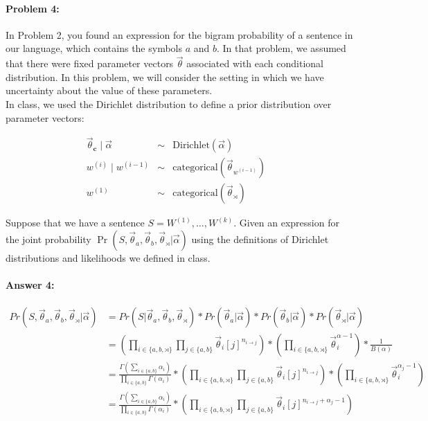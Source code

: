 \documentclass[10pt]{article}
\begin{document}
\hrulefill
\paragraph{Problem 4:}

In Problem 2, you found an expression for the bigram probability of a
sentence in our language, which contains the symbols $a$ and $b$. In
that problem, we assumed that there were fixed parameter vectors
$\vec{\theta}$ associated with each conditional distribution. In this
problem, we will consider the setting in which we have uncertainty
about the value of these parameters.\\

\noindent In class, we used the Dirichlet distribution to define a
prior distribution over parameter vectors:

\begin{align}
\vec{\theta}_{\mathbf{c}} \mid \vec{\alpha} &\sim& \mathrm{Dirichlet}(\vec{\alpha}) \\
w^{(i)} \mid  w^{(i-1)} &\sim&\mathrm{categorical}(\vec{\theta}_{w^{(i-1)}}) & \\
w^{(1)} &\sim& \mathrm{categorical}(\vec{\theta}_{\rtimes})\ & 
\end{align}

\noindent Suppose that we have a sentence
$S=W^{(1)},\dots,W^{(k)}$. Given an expression for the joint
probability
$\Pr(S, \vec{\theta}_{a}, \vec{\theta}_{b}, \vec{\theta}_{\rtimes} |
\vec{\alpha})$
using the definitions of Dirichlet distributions and likelihoods we
defined in class.

\paragraph{Answer 4:}
\begin{equation*}
    \begin{split}
        Pr(S,\vec{\theta}_{a}, \vec{\theta}_{b}, \vec{\theta}_{\rtimes} | \vec{\alpha}) &=
        Pr(S|\vec{\theta}_{a}, \vec{\theta}_{b}, \vec{\theta}_{\rtimes}) * Pr(\vec{\theta}_{a} | \vec{\alpha}) * Pr(\vec{\theta}_{b} | \vec{\alpha}) * Pr(\vec{\theta}_{\rtimes} | \vec{\alpha})\\
        &= (\prod_{i \in \{a,b,\rtimes\}} \prod_{j \in \{a,b\}} \vec{\theta}_{i}[j]^{n_{i \rightarrow j}}) * (\prod_{i \in \{a, b, \rtimes\}} \vec{\theta}_i^{\alpha-1}) * \frac{1}{B(\alpha)}\\
        &= \frac{\Gamma(\sum_{i \in \{a,b\}} \alpha_i)}{\prod_{i \in \{a,b\}}\Gamma (\alpha_i)} * (\prod_{i \in \{a,b,\rtimes\}} \prod_{j \in \{a,b\}} \vec{\theta}_{i}[j]^{n_{i \rightarrow j}}) * (\prod_{i \in \{a, b, \rtimes\}} \vec{\theta}_i^{\alpha_j-1})\\
        &= \frac{\Gamma(\sum_{i \in \{a,b\}} \alpha_i)}{\prod_{i \in \{a,b\}}\Gamma (\alpha_i)} * (\prod_{i \in \{a,b,\rtimes\}} \prod_{j \in \{a,b\}} \vec{\theta}_{i}[j]^{n_{i \rightarrow j}+\alpha_j-1})
    \end{split}
\end{equation*}
\end{document}
